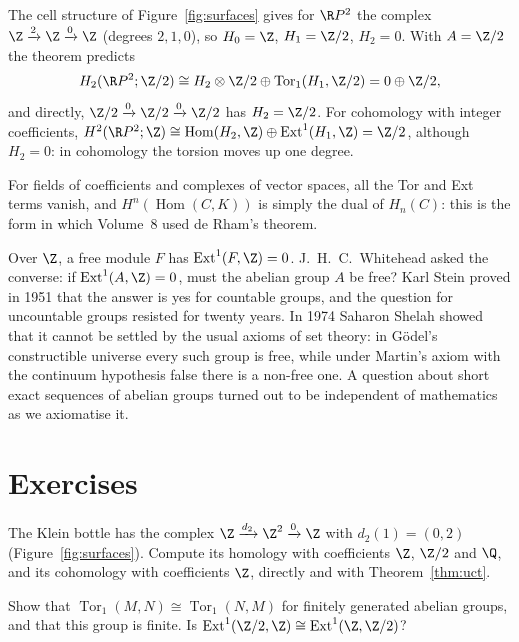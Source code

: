 \begin{example}\label{ex:rp2uct}
The cell structure of Figure~\ref{fig:surfaces} gives for $\R P^2$ the complex $\Z\xrightarrow{2}\Z\xrightarrow{0}\Z$ (degrees $2,1,0$), so $H_0=\Z$, $H_1=\Z/2$, $H_2=0$. With $A=\Z/2$ the theorem predicts
\[
H_2(\R P^2;\Z/2)\cong H_2\otimes\Z/2\oplus\operatorname{Tor}_1(H_1,\Z/2)=0\oplus\Z/2,
\]
and directly, $\Z/2\xrightarrow{0}\Z/2\xrightarrow{0}\Z/2$ has $H_2=\Z/2$. For cohomology with integer coefficients, $H^2(\R P^2;\Z)\cong\operatorname{Hom}(H_2,\Z)\oplus\operatorname{Ext}^1(H_1,\Z)=\Z/2$, although $H_2=0$:
in cohomology the torsion moves up one degree.
\end{example}

For fields of coefficients and complexes of vector spaces, all the Tor and Ext terms vanish, and $H^n(\operatorname{Hom}(C,K))$ is simply the dual of $H_n(C)$: this is the form in which Volume~8 used de Rham's theorem.

\begin{beauty}
Over $\Z$, a free module $F$ has $\operatorname{Ext}^1(F,\Z)=0$. J.~H.~C.~Whitehead asked the converse: if $\operatorname{Ext}^1(A,\Z)=0$, must the abelian group $A$ be free? Karl Stein proved in 1951 that the answer is yes for
countable groups, and the question for uncountable groups resisted for twenty years. In 1974 Saharon Shelah showed that it cannot be settled by the usual axioms of set theory: in Gödel's constructible universe
every such group is free, while under Martin's axiom with the continuum hypothesis false there is a non-free one. A question about short exact sequences of abelian groups turned out to be independent of mathematics as
we axiomatise it.
\end{beauty}

\section{Exercises}

\begin{exercise}[$\star$]\label{ex:kleinuct}
The Klein bottle has the complex $\Z\xrightarrow{d_2}\Z^2\xrightarrow{0}\Z$ with $d_2(1)=(0,2)$ (Figure~\ref{fig:surfaces}). Compute its homology with coefficients $\Z$, $\Z/2$ and $\Q$, and its cohomology with coefficients
$\Z$, directly and with Theorem~\ref{thm:uct}.
\end{exercise}

\begin{exercise}[$\star$]\label{ex:torsym}
Show that $\operatorname{Tor}_1(M,N)\cong\operatorname{Tor}_1(N,M)$ for finitely generated abelian groups, and that this group is finite. Is $\operatorname{Ext}^1(\Z/2,\Z)\cong\operatorname{Ext}^1(\Z,\Z/2)$?
\end{exercise}

